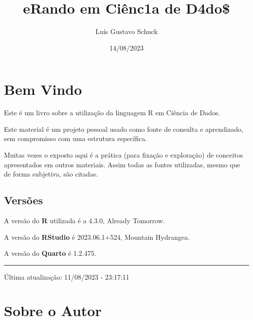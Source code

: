 \documentclass[
  letterpaper,
  DIV=11,
  numbers=noendperiod]{scrreprt}
\title{eRando em Ciênc1a de D4do\$}
\author{Luís Gustavo Schuck}
\date{14/08/2023}
\renewcommand*\contentsname{Índice}
\newcommand\contentsname{Índice}
\begin{document}
\maketitle
\ifdefined\Shaded\renewenvironment{Shaded}{\begin{tcolorbox}[borderline west={3pt}{0pt}{shadecolor}, boxrule=0pt, breakable, enhanced, frame hidden, sharp corners, interior hidden]}{\end{tcolorbox}}\fi

\renewcommand*\contentsname{Índice}
{
\hypersetup{linkcolor=}
\setcounter{tocdepth}{2}
\tableofcontents
}

\hypertarget{bem-vindo}{%
\chapter*{Bem Vindo}\label{bem-vindo}}


Este é um livro sobre a utilização da linguagem R em Ciência de Dados.

Este material é um projeto pessoal usado como fonte de consulta e
aprendizado, sem compromisso com uma estrutura específica.

Muitas vezes o exposto aqui é a prática (para fixação e exploração) de
conceitos apresentados em outros materiais. Assim todas as fontes
utilizadas, mesmo que de forma subjetiva, são citadas.

\hypertarget{versuxf5es}{%
\section*{Versões}\label{versuxf5es}}


A versão do \textbf{R} utilizada é a 4.3.0, Already Tomorrow.

A versão do \textbf{RStudio} é 2023.06.1+524, Mountain Hydrangea.

A versão do \textbf{Quarto} é 1.2.475.

\begin{center}\rule{0.5\linewidth}{0.5pt}\end{center}

Última atualização: 11/08/2023 - 23:17:11


\hypertarget{sobre-o-autor}{%
\chapter*{Sobre o Autor}\label{sobre-o-autor}}
\end{document}
